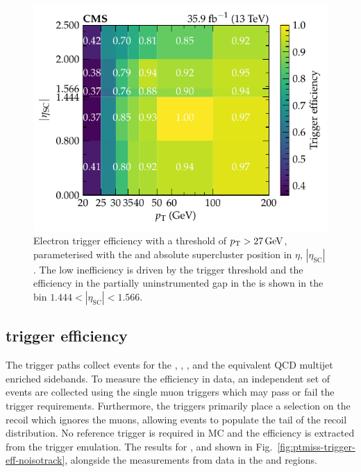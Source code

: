 \begin{figure}[htb]
    \centering
    \includegraphics{chapters/041_corrections/images/efficiencies/triggers/electrons/electron_trigger_efficiency.pdf}
    \caption[Electron trigger efficiency.]{
        Electron trigger efficiency with a threshold of ${p_{\text{T}}>\SI{27}{GeV}}$, parameterised with the \pt and absolute supercluster position in $\eta$, $|\eta_{\mathrm{SC}}|$. The low \pt inefficiency is driven by the trigger threshold and the efficiency in the partially uninstrumented gap in the \ECAL is shown in the bin ${1.444<|\eta_{\mathrm{SC}}|<1.566}$.
    }
    \label{fig:electron-trigger-efficiency}
\end{figure}


\subsection{\ptmiss trigger efficiency}\label{sec:met-trigger-efficiency}

The \ptmiss trigger paths collect events for the \metplusjets, \muplusjets, \dimuplusjets, \tauplusjets and the equivalent QCD multijet enriched sidebands. To measure the efficiency in data, an independent set of events are collected using the single muon triggers which may pass or fail the \ptmiss trigger requirements. Furthermore, the \ptmiss triggers primarily place a selection on the recoil which ignores the muons, allowing events to populate the tail of the recoil distribution. No reference trigger is required in MC and the efficiency is extracted from the trigger emulation. The results for \IZvvj, \IWlvj and \IDYllj shown in Fig.~\ref{fig:ptmiss-trigger-eff-noisotrack}, alongside the measurements from data in the \muplusjets and \dimuplusjets regions.

